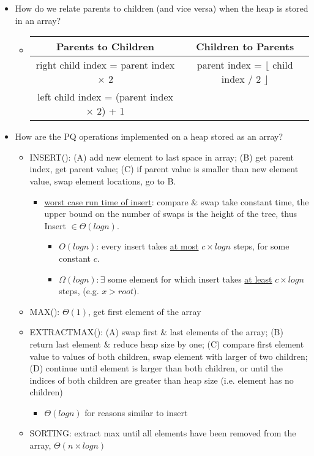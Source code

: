 \documentclass[11pt, oneside]{article}
\begin{document}
\begin{itemize}
	\item How do we relate parents to children (and vice versa) when the heap is stored in an array?
		\begin{itemize}
		\item \begin{tabular}{ |c|c| } 
			\hline
			Parents to Children & Children to Parents \\
			\hline
			right child index = parent index $\times$ 2	& parent index = $\lfloor$ child index / 2 $\rfloor$ \\ 
			\hline
			left child index = (parent index $\times$ 2) + 1	& \\ 
			\hline
			\end{tabular}
		\end{itemize}
	
	\item How are the PQ operations implemented on a heap stored as an array?
		\begin{itemize}
		\item INSERT(): (A) add new element to last space in array; (B) get parent index, get parent value; (C) if parent value is smaller than new element value, swap element locations, go to B.
			\begin{itemize}
			\item \underline{worst case run time of insert}: compare $\&$ swap take constant time, the upper bound on the number of swaps is the height of the tree, thus Insert $\in \Theta(logn)$.
				\begin{itemize}
				\item $O(logn)$: every insert takes \underline{at most} $c\times logn$ steps, for some constant $c$.
				\item $\Omega(logn): \exists $ some element for which insert takes \underline{at least} $c\times logn$ steps, (e.g. $x > \textit{root}).$
				\end{itemize}

			\end{itemize}

		\item MAX(): $\Theta(1)$, get first element of the array
		\item EXTRACTMAX(): (A) swap first $\&$ last elements of the array; (B) return last element $\&$ reduce heap size by one; (C) compare first element value to values of both children, swap element with larger of two children; (D) continue until element is larger than both children, or until the indices of both children are greater than heap size (i.e. element has no children)
			\begin{itemize}
			\item $\Theta(logn)$ for reasons similar to insert
			\end{itemize}
		\item SORTING: extract max until all elements have been removed from the array, $\Theta(n\times logn)$
		\end{itemize}
\end{itemize}
\end{document}
